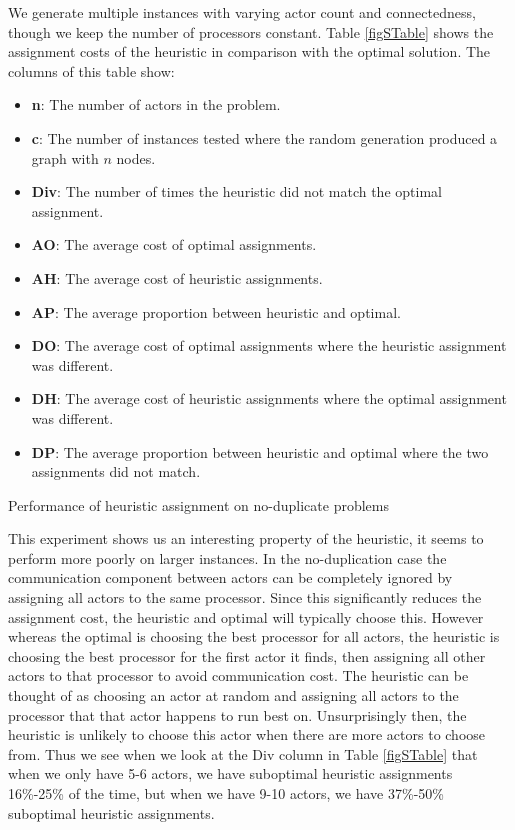 We generate multiple instances with varying actor count and connectedness, though we keep the number of processors constant.
Table \ref{figSTable} shows the assignment costs of the heuristic in comparison with the optimal solution.
The columns of this table show:
\begin{itemize}
	\item {\bf n}: The number of actors in the problem.
	\item {\bf c}: The number of instances tested where the random generation produced a graph with $n$ nodes.
	\item {\bf Div}: The number of times the heuristic did not match the optimal assignment.
	\item {\bf AO}: The average cost of optimal assignments.
	\item {\bf AH}: The average cost of heuristic assignments.
	\item {\bf AP}: The average proportion between heuristic and optimal.
	\item {\bf DO}: The average cost of optimal assignments where the heuristic assignment was different.
	\item {\bf DH}: The average cost of heuristic assignments where the optimal assignment was different.
	\item {\bf DP}: The average proportion between heuristic and optimal where the two assignments did not match.
\end{itemize}

\begin{table}
\begin{center}
	
\caption{Performance of heuristic assignment on no-duplicate problems}
\label{figSTable}
\end{center}
\end{table}

This experiment shows us an interesting property of the heuristic, it seems to perform more poorly on larger instances.
In the no-duplication case the communication component between actors can be completely ignored by assigning all actors to the same processor.
Since this significantly reduces the assignment cost, the heuristic and optimal will typically choose this.
However whereas the optimal is choosing the best processor for all actors, the heuristic is choosing the best processor for the first actor it finds, then assigning all other actors to that processor to avoid communication cost.
The heuristic can be thought of as choosing an actor at random and assigning all actors to the processor that that actor happens to run best on.
Unsurprisingly then, the heuristic is unlikely to choose this actor when there are more actors to choose from.
Thus we see when we look at the Div column in Table \ref{figSTable} that when we only have 5-6 actors, we have suboptimal heuristic assignments 16\%-25\% of the time, but when we have 9-10 actors, we have 37\%-50\% suboptimal heuristic assignments.

